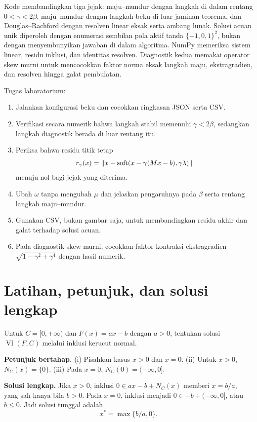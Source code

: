 Kode membandingkan tiga jejak: maju--mundur dengan langkah di dalam rentang
$0<\gamma<2\beta$, maju--mundur dengan langkah beku di luar jaminan teorema,
dan Douglas--Rachford dengan resolven linear eksak serta ambang lunak. Solusi
acuan unik diperoleh dengan enumerasi sembilan pola aktif tanda
$\{-1,0,1\}^2$, bukan dengan menyembunyikan jawaban di dalam algoritma.
NumPy memeriksa sistem linear, residu inklusi, dan identitas resolven.
Diagnostik kedua memakai operator skew murni untuk mencocokkan faktor norma
eksak langkah maju, ekstragradien, dan resolven hingga galat pembulatan.

Tugas laboratorium:
\begin{enumerate}
  \item Jalankan konfigurasi beku dan cocokkan ringkasan JSON serta CSV.
  \item Verifikasi secara numerik bahwa langkah stabil memenuhi
    $\gamma<2\beta$, sedangkan langkah diagnostik berada di luar rentang itu.
  \item Periksa bahwa residu titik tetap
    \begin{equation}
      r_\gamma(x)=
      \|x-\operatorname{soft}(x-\gamma(Mx-b),\gamma\lambda)\|
    \end{equation}
    menuju nol bagi jejak yang diterima.
  \item Ubah $\omega$ tanpa mengubah $\mu$ dan jelaskan pengaruhnya pada
    $\beta$ serta rentang langkah maju--mundur.
  \item Gunakan CSV, bukan gambar saja, untuk membandingkan residu akhir dan
    galat terhadap solusi acuan.
  \item Pada diagnostik skew murni, cocokkan faktor kontraksi ekstragradien
    $\sqrt{1-\gamma^2+\gamma^4}$ dengan hasil numerik.
\end{enumerate}

\section{Latihan, petunjuk, dan solusi lengkap}
\label{orig02:section:exercises}

\begin{exercise}
  \label{orig02:exercise:vi-normal}
  Untuk $C=[0,+\infty)$ dan $F(x)=ax-b$ dengan $a>0$, tentukan solusi
  $\operatorname{VI}(F,C)$ melalui inklusi kerucut normal.

  \textbf{Petunjuk bertahap.}
  (i) Pisahkan kasus $x>0$ dan $x=0$.
  (ii) Untuk $x>0$, $N_C(x)=\{0\}$.
  (iii) Pada $x=0$, $N_C(0)=(-\infty,0]$.

  \textbf{Solusi lengkap.}
  Jika $x>0$, inklusi $0\in ax-b+N_C(x)$ memberi $x=b/a$, yang sah hanya
  bila $b>0$. Pada $x=0$, inklusi menjadi
  $0\in-b+(-\infty,0]$, atau $b\leq0$. Jadi solusi tunggal adalah
  \begin{equation}
    x^*=\max\{b/a,0\}.
  \end{equation}
\end{exercise}

